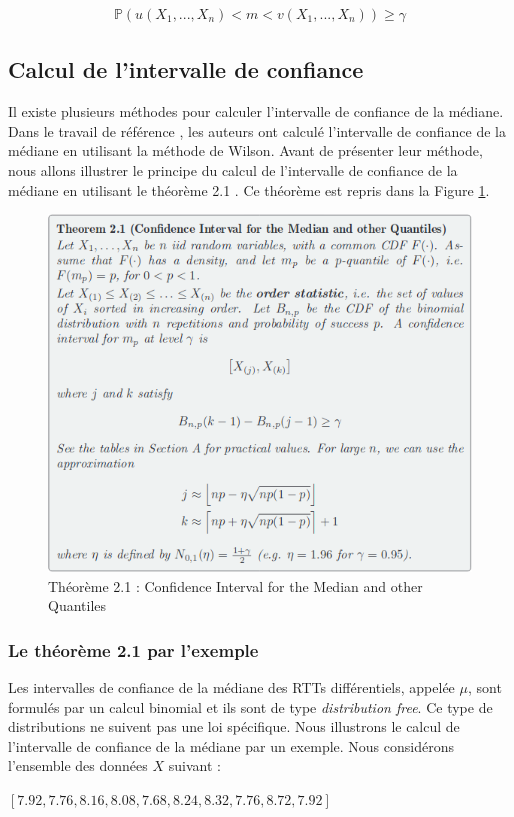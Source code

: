 \begin{align}
 \mathbb{P}(u(X_1,...,X_n)< m< v(X_1,...,X_n)) \geq \gamma
\end{align}




\subsection{Calcul de l'intervalle de confiance}

Il existe plusieurs méthodes pour calculer l'intervalle de confiance de la médiane. Dans le travail de référence \cite{DBLP:journals/corr/FontugneAPB16}, les auteurs ont calculé l'intervalle de confiance de la médiane en utilisant la méthode de Wilson. Avant de présenter leur méthode, nous allons illustrer le principe du calcul de l'intervalle de confiance de la médiane en utilisant le théorème  2.1  \cite{leboudec2010performance}. Ce théorème est repris dans la Figure \ref{fig:thereme-2-1-ci-median}.

\begin{figure}[h]
	\centering
	\captionsetup{justification=centering}
	\includegraphics[width=0.7\linewidth]{illustrations/thereme-2-1-CI-median}
	\caption{Théorème 2.1 :  Confidence Interval for the Median and other Quantiles\cite{leboudec2010performance}}
	\label{fig:thereme-2-1-ci-median}
\end{figure}

\subsubsection{Le théorème 2.1 par l'exemple} \label{CI-theorem}

Les intervalles de confiance de la médiane des RTTs différentiels, appelée $\mu$, sont formulés par un calcul binomial et ils sont de type \textit{distribution free}. Ce type de distributions ne suivent pas une loi spécifique.
Nous illustrons le calcul de l'intervalle de confiance de la médiane par un exemple.  Nous considérons  l'ensemble des données $X$ suivant : 
 \begin{center}
 $[7.92, 7.76, 8.16, 8.08, 7.68, 8.24, 8.32, 7.76, 8.72, 7.92]$
 \end{center}


